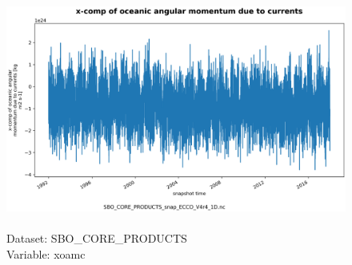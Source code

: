 \begin{figure}[H]
\centering
\includegraphics[scale=0.5]{../images/plots/oneD_plots/SBO_Core_Products/xoamc.png}
\caption{\\Dataset: SBO\_CORE\_PRODUCTS\\Variable: xoamc}
\label{tab:table-SBO_CORE_PRODUCTS_xoamc-Plot}
\end{figure}
\pagebreak

